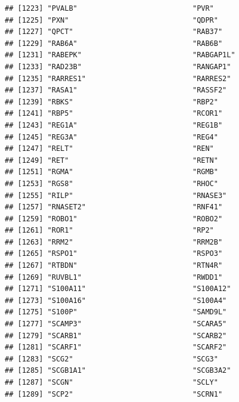 \documentclass[
]{article}
\begin{document}
\begin{verbatim}
## [1223] "PVALB"                           "PVR"                            
## [1225] "PXN"                             "QDPR"                           
## [1227] "QPCT"                            "RAB37"                          
## [1229] "RAB6A"                           "RAB6B"                          
## [1231] "RABEPK"                          "RABGAP1L"                       
## [1233] "RAD23B"                          "RANGAP1"                        
## [1235] "RARRES1"                         "RARRES2"                        
## [1237] "RASA1"                           "RASSF2"                         
## [1239] "RBKS"                            "RBP2"                           
## [1241] "RBP5"                            "RCOR1"                          
## [1243] "REG1A"                           "REG1B"                          
## [1245] "REG3A"                           "REG4"                           
## [1247] "RELT"                            "REN"                            
## [1249] "RET"                             "RETN"                           
## [1251] "RGMA"                            "RGMB"                           
## [1253] "RGS8"                            "RHOC"                           
## [1255] "RILP"                            "RNASE3"                         
## [1257] "RNASET2"                         "RNF41"                          
## [1259] "ROBO1"                           "ROBO2"                          
## [1261] "ROR1"                            "RP2"                            
## [1263] "RRM2"                            "RRM2B"                          
## [1265] "RSPO1"                           "RSPO3"                          
## [1267] "RTBDN"                           "RTN4R"                          
## [1269] "RUVBL1"                          "RWDD1"                          
## [1271] "S100A11"                         "S100A12"                        
## [1273] "S100A16"                         "S100A4"                         
## [1275] "S100P"                           "SAMD9L"                         
## [1277] "SCAMP3"                          "SCARA5"                         
## [1279] "SCARB1"                          "SCARB2"                         
## [1281] "SCARF1"                          "SCARF2"                         
## [1283] "SCG2"                            "SCG3"                           
## [1285] "SCGB1A1"                         "SCGB3A2"                        
## [1287] "SCGN"                            "SCLY"                           
## [1289] "SCP2"                            "SCRN1"                          

\end{verbatim}
\end{document}
